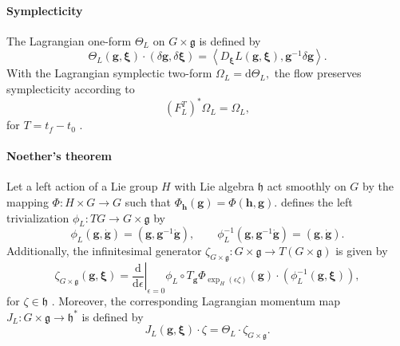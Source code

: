 \paragraph{Symplecticity}
The Lagrangian one-form $\Theta_L$ on $G\times\mathfrak g$ is defined by
\begin{equation}
    \Theta_L(\bm{g},\bm{\xi})\cdot(\delta\bm{g},\delta\bm{\xi})
    =
    \left\langle
        D_{\bm{\xi}}L(\bm{g},\bm{\xi}),
        \bm{g}^{-1}\delta\bm{g}
    \right\rangle.
    \label{eq:continuous_lagrangian_one_form}
\end{equation}
With the Lagrangian symplectic two-form $\Omega_L=\mathrm d\Theta_L,$
the flow preserves symplecticity according to
\begin{equation}
    \left(F_L^T\right)^*\Omega_L=\Omega_L,
    \label{eq:continuous_lagrangian_flow_symplecticity}
\end{equation}
for $T=t_f-t_0$ \cite{Lee2008}.

\paragraph{Noether's theorem}
Let a left action of a Lie group $H$ with Lie algebra $\mathfrak h$ act  
smoothly on $G$ by the mapping $\Phi:H\times G\rightarrow G$ such that
$\Phi_{\bm{h}}(\bm{g})=\Phi(\bm{h},\bm{g})$. \cite{Lee2008} defines the left trivialization 
$\phi_L:TG \to G\times\mathfrak g$ by
\begin{equation}\label{eq:left_trivialization_noethers_theorem}
    \phi_L(\bm{g},\dot{\bm{g}}) = (\bm{g}, \bm{g}^{-1}\dot{\bm{g}}),
    \qquad
    \phi_L^{-1}(\bm{g},\bm{g}^{-1}\dot{\bm{g}}) = (\bm{g},\dot{\bm{g}}).
\end{equation}
Additionally, the infinitesimal generator $\zeta_{G\times\mathfrak{g}}: G \times \mathfrak g \to T(G\times\mathfrak g)$ is given by
\begin{equation}
    \zeta_{G\times\mathfrak g}(\bm{g},\bm{\xi})
    =
    \left.\frac{\mathrm d}{\mathrm d\epsilon}\right|_{\epsilon=0}
        \phi_L
        \circ T_{\bm{g}}\Phi_{\exp_H(\epsilon\zeta)}(\bm{g})
        \cdot (\phi_L^{-1}(\bm{g},\bm{\xi})),
    \label{eq:lifted_infinitesimal_generator}
\end{equation}
for $\zeta\in\mathfrak h$ \cite{Lee2008}.
Moreover, the corresponding Lagrangian momentum map $J_L:G\times\mathfrak g\rightarrow\mathfrak h^*$ is defined by
\begin{equation}
    J_L(\bm{g},\bm{\xi})\cdot\zeta
    =
    \Theta_L\cdot
    \zeta_{G\times\mathfrak g}.
    \label{eq:continuous_lagrangian_momentum_map}
\end{equation}

